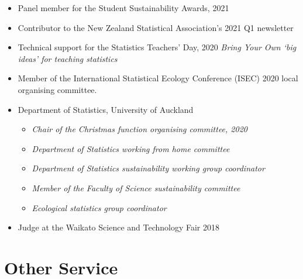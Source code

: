 \documentclass[10pt,a4paper]{moderncv}
\begin{document}
\begin{itemize}
  \item Panel member for the Student Sustainability Awards, 2021
  \item Contributor to the New Zealand Statistical Association's 2021 Q1 newsletter
  \item Technical support for the Statistics Teachers' Day, 2020 \textit{Bring Your Own `big ideas' for teaching statistics}
\item Member of the International Statistical Ecology Conference (ISEC) 2020 local organising committee.
\item Department of Statistics, University of Auckland
  \begin{itemize}
  \item \textit{Chair of the Christmas function organising committee, 2020}
  \item \textit{Department of Statistics working from home committee}
  \item \textit{Department of Statistics sustainability working group coordinator}
  \item \textit{Member of the Faculty of Science sustainability committee}
  \item \textit{Ecological statistics group coordinator}
  \end{itemize}
\item Judge at the Waikato Science and Technology Fair 2018
\end{itemize}



\section{Other Service}

\vspace{6pt}
\end{document}
